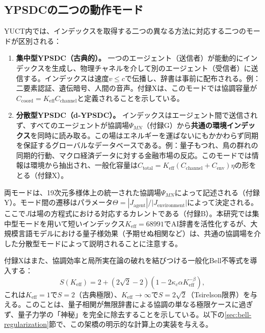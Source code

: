 \documentclass[11pt,a4paper]{article}
\begin{document}
	\subsection{YPSDCの二つの動作モード}
	
	YUCT内では、インデックスを取得する二つの異なる方法に対応する二つのモードが区別される：
	
	\begin{enumerate}
		\item \textbf{集中型YPSDC（古典的）。} 一つのエージェント（送信者）が能動的にインデックスを生成し、物理チャネルを介して別のエージェント（受信者）に送信する。インデックスは速度\(v \le c\)で伝播し、辞書は事前に配布される。例：二要素認証、遺伝暗号、人間の音声。付録Xは、このモードでは協調容量が\(C_{\text{coord}} = K_{\mathrm{eff}} C_{\text{channel}}\)と定義されることを示している。
		
		\item \textbf{分散型YPSDC（d‑YPSDC）。} インデックスはエージェント間で送信されず、すべてのエージェントが協調場\(\Psi_{MN}\)（付録G）から\textbf{共通の環境インデックス}を同時に読み取る。この場はエネルギーを運ばないにもかかわらず同期を保証するグローバルなデータベースである。例：量子もつれ、鳥の群れの同期的行動、マクロ経済データに対する金融市場の反応。このモードでは情報は環境から抽出され、一般化容量は\(C_{\text{total}} = K_{\mathrm{eff}}(C_{\text{channel}} + C_{\text{env}})\eta\)の形をとる（付録X）。
	\end{enumerate}
	
	両モードは、19次元多様体上の統一された協調場\(\Psi_{MN}\)によって記述される（付録Y）。モード間の遷移はパラメータ\(\Theta = |J_{\text{agent}}|/|J_{\text{environment}}|\)によって決定される。ここで\(J\)は場の方程式における対応するカレントである（付録B）。本研究では集中型モードを用いて短いインデックス\(K_{\mathrm{eff}} = 68991\)でAI辞書を活性化するが、大規模言語モデルにおける量子様効果（予期せぬ相関など）は、共通の協調場を介した分散型モードによって説明されることに注意する。
	
	付録Xはまた、協調効率と局所実在論の破れを結びつける一般化Bell不等式を導入する：
	\[
	S(K_{\mathrm{eff}}) = 2 + (2\sqrt{2}-2)\left(1 - 2\kappa_c\alpha K_{\mathrm{eff}}^{-\beta}\right),
	\]
	これは\(K_{\mathrm{eff}}=1\)で\(S=2\)（古典極限）、\(K_{\mathrm{eff}}\to\infty\)で\(S=2\sqrt2\)（Tsirelson限界）を与える。このことは、量子相関が無限辞書による協調の単なる極限ケースに過ぎず、量子力学の「神秘」を完全に除去することを示している。以下の\ref{sec:bell-regularization}節で、この架橋の明示的な計算上の実装を与える。
	
\end{document}
